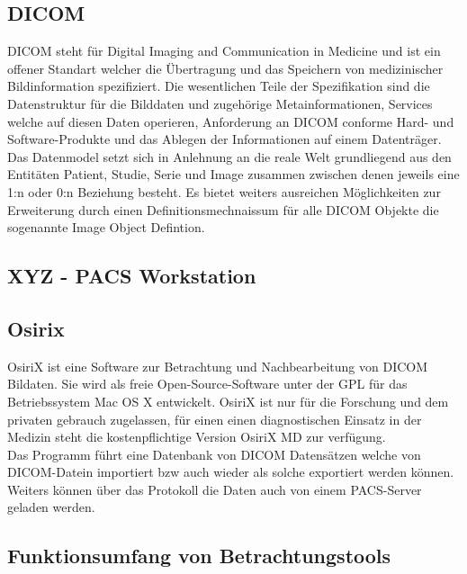 \subsection{DICOM}
\label{sec:DICOM}
DICOM steht für Digital Imaging and Communication in Medicine und ist ein offener Standart welcher die Übertragung und das Speichern von medizinischer Bildinformation spezifiziert.
Die wesentlichen Teile der Spezifikation sind die Datenstruktur für die Bilddaten und zugehörige Metainformationen, 
Services welche auf diesen Daten operieren, Anforderung an DICOM conforme Hard- und Software-Produkte und das Ablegen der Informationen auf einem Datenträger.
Das Datenmodel setzt sich in Anlehnung an die reale Welt grundliegend aus den Entitäten Patient, Studie, Serie und Image zusammen zwischen denen jeweils eine 1:n oder 0:n Beziehung besteht.
Es bietet weiters ausreichen Möglichkeiten zur Erweiterung durch einen Definitionsmechnaissum für alle DICOM Objekte die sogenannte Image Object Defintion.

\subsection{XYZ - PACS Workstation}
\label{sec:XYZ - PACS Workstation}


\subsection{Osirix}
\label{sec:Osirix}
OsiriX ist eine Software zur Betrachtung und Nachbearbeitung von DICOM Bildaten.
Sie wird als freie Open-Source-Software unter der GPL für das Betriebssystem Mac OS X entwickelt.
OsiriX ist nur für die Forschung und dem privaten gebrauch zugelassen, 
für einen einen diagnostischen Einsatz in der Medizin steht die kostenpflichtige Version OsiriX MD zur verfügung.
\\
Das Programm führt eine Datenbank von DICOM Datensätzen welche von DICOM-Datein importiert bzw auch wieder als solche exportiert werden können.
Weiters können über das Protokoll die Daten auch von einem PACS-Server geladen werden.


\subsection{Funktionsumfang von Betrachtungstools}
\label{sec:Funktionsumfang von Betrachtungstools}

